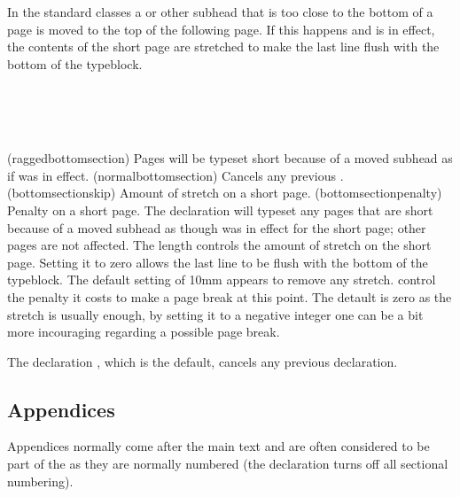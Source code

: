     In the standard classes a \cmd{\section} or other 
subhead
that is too close to the bottom of a page is moved to the top of the
following page. If this happens and \cmd{\flushbottom} is in effect, the
contents of the short page are stretched to make the last line flush with
the bottom of the typeblock.
\begin{syntax}
\cmd{\raggedbottomsection} \\
\cmd{\normalbottomsection} \\
\lnc{\bottomsectionskip} \\
\cmd{\bottomsectionpenalty}
\end{syntax}
\glossary(raggedbottomsection)%
  {}%
  {Pages will be typeset short because of a moved subhead as if
    was in effect.}
\glossary(normalbottomsection)%
  {}%
  {Cancels any previous .}
\glossary(bottomsectionskip)%
  {}%
  {Amount of stretch on a  short page.}
\glossary(bottomsectionpenalty)%
  {}%
  {Penalty on a  short page.}
The \cmd{\raggedbottomsection} declaration will typeset any pages that 
are short because of a moved subhead as though \cmd{\raggedbottom}
was in effect for the short page; other pages are not affected. The
length \lnc{\bottomsectionskip} controls the amount of stretch on the short
page. Setting it to zero allows the last line to be flush with the bottom
of the typeblock. The default setting of 10mm appears to remove any
stretch. \cmd{\bottomsectionpenalty} control the penalty it costs to
make a page break at this point. The detault is zero as the stretch is
usually enough, by setting it to
a negative integer one can be a bit more incouraging regarding a
possible page break.

The declaration \cmd{\normalbottomsection}, which is the default,
cancels any previous \cmd{\raggedbottomsection} declaration.

\subsection{Appendices} \label{sec:appendices}

Appendices normally come after the main text and are 
often considered to be part
of the \cmd{\mainmatter} as they are normally numbered (the \cmd{\backmatter}
declaration turns off all sectional numbering).

